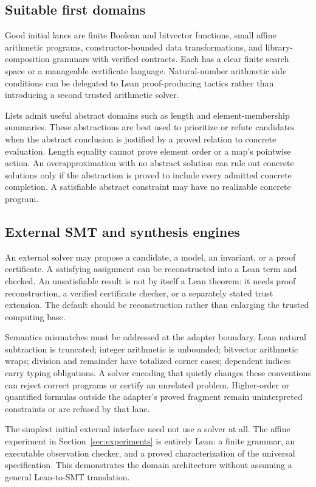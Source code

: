\subsection{Suitable first domains}

Good initial lanes are finite Boolean and bitvector functions, small affine arithmetic programs, constructor-bounded data transformations, and library-composition grammars with verified contracts. Each has a clear finite search space or a manageable certificate language. Natural-number arithmetic side conditions can be delegated to Lean proof-producing tactics rather than introducing a second trusted arithmetic solver.

Lists admit useful abstract domains such as length and element-membership summaries. These abstractions are best used to prioritize or refute candidates when the abstract conclusion is justified by a proved relation to concrete evaluation. Length equality cannot prove element order or a map's pointwise action. An overapproximation with no abstract solution can rule out concrete solutions only if the abstraction is proved to include every admitted concrete completion. A satisfiable abstract constraint may have no realizable concrete program.

\subsection{External SMT and synthesis engines}

An external solver may propose a candidate, a model, an invariant, or a proof certificate. A satisfying assignment can be reconstructed into a Lean term and checked. An unsatisfiable result is not by itself a Lean theorem: it needs proof reconstruction, a verified certificate checker, or a separately stated trust extension. The default should be reconstruction rather than enlarging the trusted computing base.

Semantics mismatches must be addressed at the adapter boundary. Lean natural subtraction is truncated; integer arithmetic is unbounded; bitvector arithmetic wraps; division and remainder have totalized corner cases; dependent indices carry typing obligations. A solver encoding that quietly changes these conventions can reject correct programs or certify an unrelated problem. Higher-order or quantified formulas outside the adapter's proved fragment remain uninterpreted constraints or are refused by that lane.

The simplest initial external interface need not use a solver at all. The affine experiment in Section~\ref{sec:experiments} is entirely Lean: a finite grammar, an executable observation checker, and a proved characterization of the universal specification. This demonstrates the domain architecture without assuming a general Lean-to-SMT translation.

